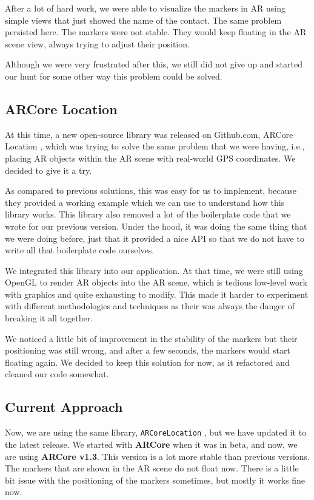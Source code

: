 After a lot of hard work, we were able to visualize the markers in AR using simple views that just showed the name of the contact. The same problem persisted here. The markers were not stable. They would keep floating in the AR scene view, always trying to adjust their position.

Although we were very frustrated after this, we still did not give up and started our hunt for some other way this problem could be solved.

\subsection{ARCore Location}
At this time, a new open-source library was released on Github.com, ARCore Location \cite{ARCoreLocation2018}, which was trying to solve the same problem that we were having, i.e., placing AR objects within the AR scene with real-world GPS coordinates. We decided to give it a try.

As compared to previous solutions, this was easy for us to implement, because they provided a working example which we can use to understand how this library works. This library also removed a lot of the boilerplate code that we wrote for our previous version. Under the hood, it was doing the same thing that we were doing before, just that it provided a nice API so that we do not have to write all that boilerplate code ourselves.

We integrated this library into our application. At that time, we were still using OpenGL to render AR objects into the AR scene, which is tedious low-level work with graphics and quite exhausting to modify. This made it harder to experiment with different methodologies and techniques as their was always the danger of breaking it all together.

We noticed a little bit of improvement in the stability of the markers but their positioning was still wrong, and after a few seconds, the markers would start floating again. We decided to keep this solution for now, as it refactored and cleaned our code somewhat.

\subsection{Current Approach}
Now, we are using the same library, \texttt{ARCoreLocation} \cite{ARCoreLocation2018}, but we have updated it to the latest release. We started with \textbf{ARCore} when it was in beta, and now, we are using \textbf{ARCore v1.3}. This version is a lot more stable than previous versions. The markers that are shown in the AR scene do not float now. There is a little bit issue with the positioning of the markers sometimes, but mostly it works fine now.

